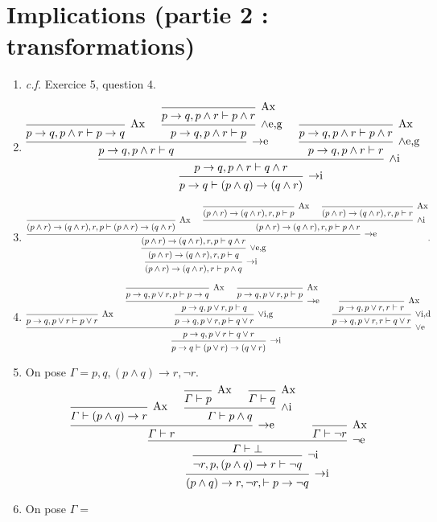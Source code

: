 \section{Implications (partie 2 : transformations)}

\begin{enumerate}
	\item \textit{c.f.} Exercice 5, question 4.
	\item
		\[
			\begin{prooftree}
				\infer 0[Ax]{p\to q, p \land r \vdash p \to q}
				\infer 0[Ax]{p\to q, p \land r \vdash p \land r}
				\infer 1[$\land$e,g]{p\to q, p \land r \vdash p}
				\infer 2[$\to$e]{p\to q, p \land r \vdash q}
				\infer 0[Ax]{p\to q, p \land r \vdash p \land r}
				\infer 1[$\land$e,g]{p\to q, p \land r \vdash r}
				\infer 2[$\land$i]{p\to q, p \land r \vdash q \land r}
				\infer 1[$\to$i]{p\to q \vdash (p \land q) \to (q \land r)}
			\end{prooftree}
		\]
	\item
		\[
			\begin{prooftree}
				\infer 0[Ax]{(p \land r) \to (q \land r), r, p \vdash (p \land r) \to (q \land r)}
				\infer 0[Ax]{(p \land r) \to (q \land r), r, p \vdash p}
				\infer 0[Ax]{(p \land r) \to (q \land r), r, p \vdash r}
				\infer 2[$\land$i]{(p \land r) \to (q \land r), r, p \vdash p \land r}
				\infer 2[$\to$e]{(p \land r) \to (q \land r), r, p \vdash q \land r}
				\infer 1[$\lor$e,g]{(p \land r) \to (q \land r), r, p \vdash q}
				\infer 1[$\to$i]{(p \land r) \to (q \land r), r \vdash p \land q}
			\end{prooftree}
		.\]
	\item
		\[
			\begin{prooftree}
				\infer 0[Ax]{p \to q, p \lor r \vdash p \lor r}
				\infer 0[Ax]{p \to q, p \lor r, p \vdash p \to q}
				\infer 0[Ax]{p \to q, p \lor r, p \vdash p}
				\infer 2[$\to$e]{p \to q, p \lor r, p \vdash q}
				\infer 1[$\lor$i,g]{p \to q, p \lor r, p \vdash q \lor r}
				\infer 0[Ax]{p \to q, p \lor r, r \vdash r}
				\infer 1[$\lor$i,d]{p \to q, p \lor r, r \vdash q \lor r}
				\infer 3[$\lor$e]{p\to q, p \lor r \vdash q \lor r}
				\infer 1[$\to$i]{p\to q \vdash (p \lor r) \to (q \lor r)}
			\end{prooftree}
		\]
	\item On pose $\Gamma = p,q, (p \land q) \to r, \lnot r$.
		\[
			\begin{prooftree}
				\infer 0[Ax]{\Gamma \vdash (p \land q) \to r}
				\infer 0[Ax]{\Gamma \vdash p}
				\infer 0[Ax]{\Gamma \vdash q}
				\infer 2[$\land$i]{\Gamma \vdash p \land q}
				\infer 2[$\to$e]{\Gamma \vdash r}
				\infer 0[Ax]{\Gamma \vdash \lnot r}
				\infer 2[$\lnot$e]{\Gamma \vdash \bot}
				\infer 1[$\lnot$i]{\lnot r, p, (p \land q) \to r \vdash \lnot q}
				\infer 1[$\to$i]{(p \land q) \to r, \lnot r, \vdash p \to \lnot q}
			\end{prooftree}
		\]
	\item On pose $\Gamma = $\/
\end{enumerate}

